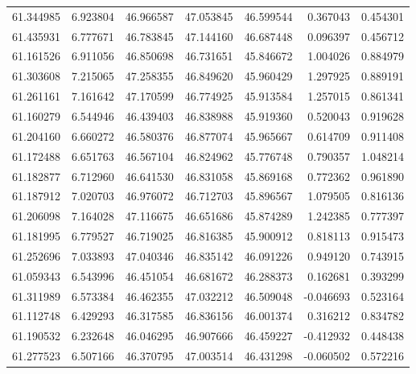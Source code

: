 \begin{tabular}{rrrrrrr}
 61.344985 &   6.923804 &         46.966587 &         47.053845 &         46.599544 &  0.367043 &  0.454301 \\
 61.435931 &   6.777671 &         46.783845 &         47.144160 &         46.687448 &  0.096397 &  0.456712 \\
 61.161526 &   6.911056 &         46.850698 &         46.731651 &         45.846672 &  1.004026 &  0.884979 \\
 61.303608 &   7.215065 &         47.258355 &         46.849620 &         45.960429 &  1.297925 &  0.889191 \\
 61.261161 &   7.161642 &         47.170599 &         46.774925 &         45.913584 &  1.257015 &  0.861341 \\
 61.160279 &   6.544946 &         46.439403 &         46.838988 &         45.919360 &  0.520043 &  0.919628 \\
 61.204160 &   6.660272 &         46.580376 &         46.877074 &         45.965667 &  0.614709 &  0.911408 \\
 61.172488 &   6.651763 &         46.567104 &         46.824962 &         45.776748 &  0.790357 &  1.048214 \\
 61.182877 &   6.712960 &         46.641530 &         46.831058 &         45.869168 &  0.772362 &  0.961890 \\
 61.187912 &   7.020703 &         46.976072 &         46.712703 &         45.896567 &  1.079505 &  0.816136 \\
 61.206098 &   7.164028 &         47.116675 &         46.651686 &         45.874289 &  1.242385 &  0.777397 \\
 61.181995 &   6.779527 &         46.719025 &         46.816385 &         45.900912 &  0.818113 &  0.915473 \\
 61.252696 &   7.033893 &         47.040346 &         46.835142 &         46.091226 &  0.949120 &  0.743915 \\
 61.059343 &   6.543996 &         46.451054 &         46.681672 &         46.288373 &  0.162681 &  0.393299 \\
 61.311989 &   6.573384 &         46.462355 &         47.032212 &         46.509048 & -0.046693 &  0.523164 \\
 61.112748 &   6.429293 &         46.317585 &         46.836156 &         46.001374 &  0.316212 &  0.834782 \\
 61.190532 &   6.232648 &         46.046295 &         46.907666 &         46.459227 & -0.412932 &  0.448438 \\
 61.277523 &   6.507166 &         46.370795 &         47.003514 &         46.431298 & -0.060502 &  0.572216 \\

\end{tabular}

